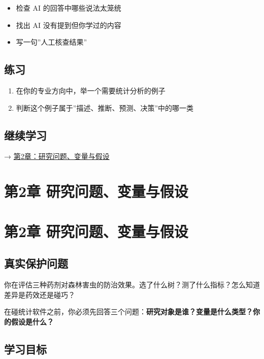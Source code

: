 \documentclass[
  letterpaper,
]{scrbook}
\providecommand{\tightlist}{%
  \setlength{\itemsep}{0pt}\setlength{\parskip}{0pt}}
\begin{document}
\begin{itemize}
\tightlist
\item
  检查 AI 的回答中哪些说法太笼统
\item
  找出 AI 没有提到但你学过的内容
\item
  写一句''人工核查结果''
\end{itemize}

\section{练习}\label{ux7ec3ux4e60}

\begin{enumerate}
\def\labelenumi{\arabic{enumi}.}
\tightlist
\item
  在你的专业方向中，举一个需要统计分析的例子
\item
  判断这个例子属于''描述、推断、预测、决策''中的哪一类
\end{enumerate}

\section{继续学习}\label{ux7ee7ux7eedux5b66ux4e60}

→ \href{02-variables-hypotheses.qmd}{第2章：研究问题、变量与假设}

\chapter{第2章
研究问题、变量与假设}\label{ux7b2c2ux7ae0-ux7814ux7a76ux95eeux9898ux53d8ux91cfux4e0eux5047ux8bbe}

\chapter{第2章
研究问题、变量与假设}\label{ux7b2c2ux7ae0-ux7814ux7a76ux95eeux9898ux53d8ux91cfux4e0eux5047ux8bbe-1}

\section{真实保护问题}\label{ux771fux5b9eux4fddux62a4ux95eeux9898-1}

你在评估三种药剂对森林害虫的防治效果。选了什么树？测了什么指标？怎么知道差异是药效还是碰巧？

在碰统计软件之前，你必须先回答三个问题：\textbf{研究对象是谁？变量是什么类型？你的假设是什么？}

\section{学习目标}\label{ux5b66ux4e60ux76eeux6807-1}
\end{document}
